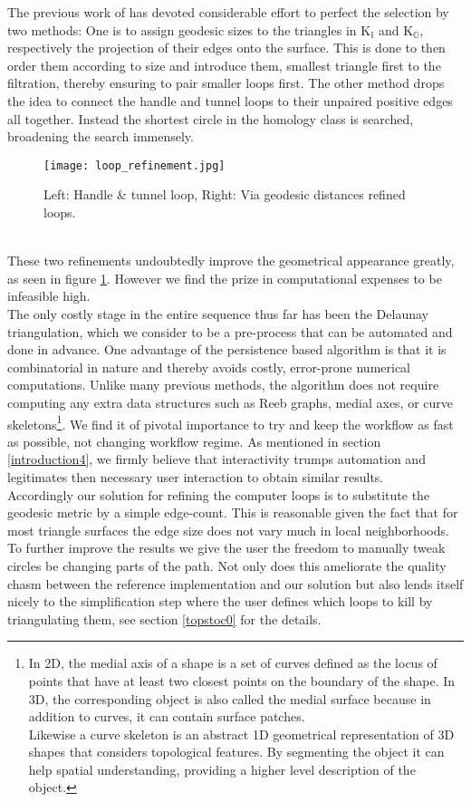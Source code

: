 The previous work of \citep[][]{Dey2007, Dey2008, Dey2009} has devoted considerable effort to perfect the selection by two methods: 
One is to assign geodesic sizes to the triangles in $\mathrm{K}_{\mathbb{I}}$ and $\mathrm{K}_{\mathbb{O}}$, respectively the projection of their edges onto the surface.
This is done to then order them according to size and introduce them, smallest triangle first to the filtration, thereby ensuring to pair smaller loops first.
The other method drops the idea to connect the handle and tunnel loops to their unpaired positive edges all together.
Instead the shortest circle in the homology class is searched, broadening the search immensely.
\begin{figure}[htb]
\centering
\texttt{[image: loop\_refinement.jpg]}
\caption{Left: Handle \& tunnel loop, Right: Via geodesic distances refined loops.}
\label{fig:loop_refinement}
\end{figure}\\
These two refinements undoubtedly improve the geometrical appearance greatly, as seen in figure \ref{fig:loop_refinement}.
However we find the prize in computational expenses to be infeasible high.\\
The only costly stage in the entire sequence thus far has been the Delaunay triangulation, which we consider to be a pre-process that can be automated and done in advance.
One advantage of the persistence based algorithm is that it is combinatorial in nature and thereby avoids costly, error-prone numerical computations.
Unlike many previous methods, the algorithm does not require computing any extra data structures such as Reeb graphs, medial axes, or curve skeletons\footnote{ In 2D, the medial axis of a shape is a set of curves defined as the locus of points that have at least two closest points on the boundary of the shape. In 3D, the corresponding object is also called the medial surface because in addition to curves, it can contain surface patches.\\
Likewise a curve skeleton is an abstract 1D geometrical representation of 3D shapes that considers topological features. By segmenting the object it can help spatial understanding, providing a higher level description of the object.}.
We find it of pivotal importance to try and keep the workflow as fast as possible, not changing workflow regime.
As mentioned in section \ref{introduction4}, we firmly believe that interactivity trumps automation and legitimates then necessary user interaction to obtain similar results.\\
Accordingly our solution for refining the computer loops is to substitute the geodesic metric by a simple edge-count.
This is reasonable given the fact that for most triangle surfaces the edge size does not vary much in local neighborhoods.
To further improve the results we give the user the freedom to manually tweak circles be changing parts of the path.
Not only does this ameliorate the quality chasm between the reference implementation and our solution but also lends itself nicely to the simplification step where the user defines which loops to kill by triangulating them, see section \ref{topstoc0} for the details.

